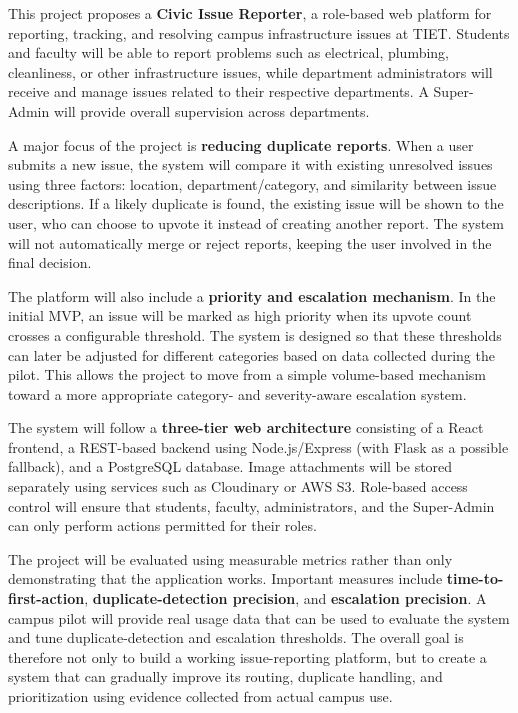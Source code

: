 \documentclass[11pt,a4paper]{article}
\begin{document}
This project proposes a \textbf{Civic Issue Reporter}, a role-based web
platform for reporting, tracking, and resolving campus infrastructure
issues at TIET. Students and faculty will be able to report problems such
as electrical, plumbing, cleanliness, or other infrastructure issues,
while department administrators will receive and manage issues related to
their respective departments. A Super-Admin will provide overall
supervision across departments.

\vspace{1em}

\noindent A major focus of the project is \textbf{reducing duplicate reports}.
When a user submits a new issue, the system will compare it with existing
unresolved issues using three factors: location, department/category, and
similarity between issue descriptions. If a likely duplicate is found, the
existing issue will be shown to the user, who can choose to upvote it
instead of creating another report. The system will not automatically
merge or reject reports, keeping the user involved in the final decision.

\vspace{1em}

\noindent The platform will also include a \textbf{priority and escalation
mechanism}. In the initial MVP, an issue will be marked as high priority
when its upvote count crosses a configurable threshold. The system is
designed so that these thresholds can later be adjusted for different
categories based on data collected during the pilot. This allows the
project to move from a simple volume-based mechanism toward a more
appropriate category- and severity-aware escalation system.

\vspace{1em}

\noindent The system will follow a \textbf{three-tier web architecture} consisting
of a React frontend, a REST-based backend using Node.js/Express (with
Flask as a possible fallback), and a PostgreSQL database. Image
attachments will be stored separately using services such as Cloudinary or
AWS S3. Role-based access control will ensure that students, faculty,
administrators, and the Super-Admin can only perform actions permitted for
their roles.

\vspace{1em}

\noindent The project will be evaluated using measurable metrics rather than only
demonstrating that the application works. Important measures include
\textbf{time-to-first-action}, \textbf{duplicate-detection precision},
and \textbf{escalation precision}. A campus pilot will provide real usage
data that can be used to evaluate the system and tune duplicate-detection
and escalation thresholds. The overall goal is therefore not only to build
a working issue-reporting platform, but to create a system that can
gradually improve its routing, duplicate handling, and prioritization
using evidence collected from actual campus use.
\end{document}
